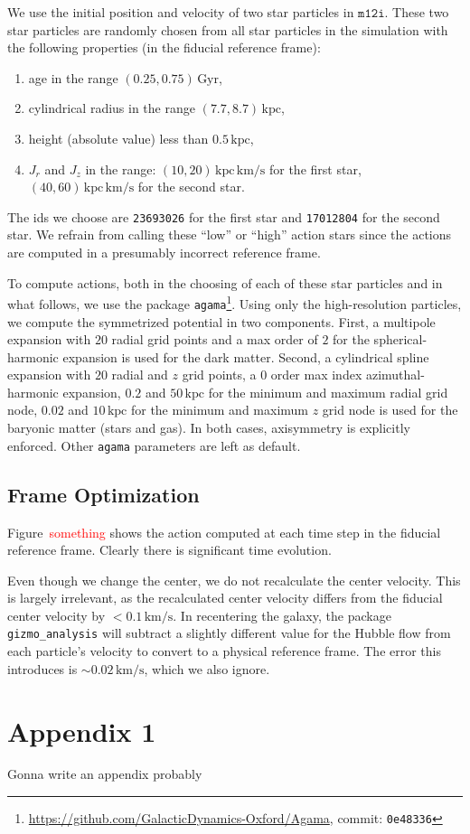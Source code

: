 \documentclass[twocolumn]{aastex62}
\newcommand{\Gus}[1]{\textcolor{red}{#1}}
\newcommand{\kpc}{\text{kpc}}
\newcommand{\Gyr}{\text{Gyr}}
\newcommand{\kms}{\text{km}/\text{s}}
\newcommand{\actunit}{\text{kpc}\,\kms}
\begin{document}
We use the initial position and velocity of two star particles in
$\texttt{m12i}$. These two star particles are randomly chosen from all star
particles in the simulation with the following properties (in the fiducial
reference frame):
\begin{enumerate}
    \item age in the range $(0.25, 0.75)\,\Gyr$,
    \item cylindrical radius in the range $(7.7, 8.7)\,\kpc$,
    \item height (absolute value) less than $0.5\,\kpc$,
    \item $J_r$ and $J_z$ in the range:
        \subitem $(10, 20)\,\actunit$ for the first star,
        \subitem $(40, 60)\,\actunit$ for the second star.
\end{enumerate}
The ids we choose are \texttt{23693026} for the first star and
\texttt{17012804} for the second star. We refrain from calling these ``low''
or ``high'' action stars since the actions are computed in a presumably
incorrect reference frame.

To compute actions, both in the choosing of each of these star particles and
in what follows, we use the package
\texttt{agama}\footnote{\url{https://github.com/GalacticDynamics-Oxford/Agama},
commit: \texttt{0e48336}}. Using only the high-resolution particles, we
compute the symmetrized potential in two components. First, a multipole
expansion with $20$ radial grid points and a max order of $2$ for the
spherical-harmonic expansion is used for the dark matter. Second, a
cylindrical spline expansion with $20$ radial and $z$ grid points, a $0$ order
max index azimuthal-harmonic expansion, $0.2$ and $50\,\kpc$ for the minimum
and maximum radial grid node, $0.02$ and $10\,\kpc$ for the minimum and
maximum $z$ grid node is used for the baryonic matter (stars and gas). In both
cases, axisymmetry is explicitly enforced. Other \texttt{agama} parameters are
left as default.

\subsection{Frame Optimization} \label{ssec:frame_opt}
Figure~\Gus{something} shows the action computed at each time step in the
fiducial reference frame. Clearly there is significant time evolution.

Even though we change the center, we do not recalculate the center velocity.
This is largely irrelevant, as the recalculated center velocity differs from
the fiducial center velocity by $<0.1\,\kms$. In recentering the galaxy, the
package \texttt{gizmo\_analysis} will subtract a slightly different value for
the Hubble flow from each particle's velocity to convert to a physical
reference frame. The error this introduces is $\sim 0.02\,\kms$, which we also
ignore.

\appendix \section{Appendix 1}
Gonna write an appendix probably 


\end{document}
